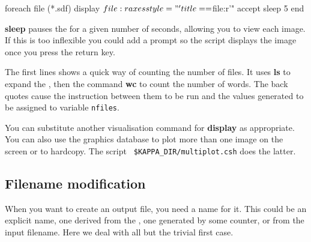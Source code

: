 \documentclass[twoside,11pt,nolof]{starlink}
\begin{document}
\begin{small}
\begin{terminalv}
     foreach file (*.sdf)
        display $file:r axes style="'title==$file:r'" accept
        sleep 5
     end
\end{terminalv}
\end{small}
\textbf{sleep} pauses the  for a given
number of seconds, allowing you to view each image.  If this is too
inflexible you could add a prompt so the script displays the image
once you press the return key.

\begin{small}
\end{small}
The first lines shows a quick way of counting the number of files. It
uses \textbf{ls} to expand the , then
the command \textbf{wc} to count the number of words.  The back quotes
cause the instruction between them to be run and the values generated
to be assigned to variable \texttt{nfiles}.

You can substitute another visualisation command for \textbf{display}
as appropriate.  You can also use the graphics database to plot more
than one image on the screen or to hardcopy.  The script {\tt
\$KAPPA\_DIR/multiplot.csh} does the latter.

\subsection{Filename modification
\label{sc4_se_filename_mod}}

 When you
want to create an output file, you need a name for it.  This could be an
explicit name, one derived from the , one
generated by some counter, or from the input filename.  Here we deal
with all but the trivial first case.
\end{document}
